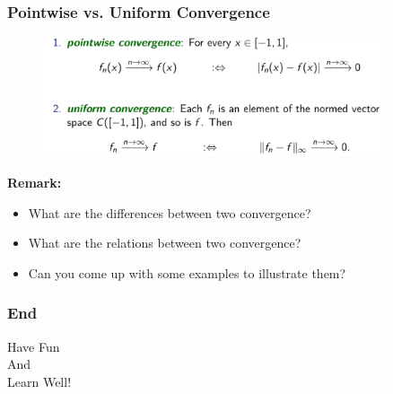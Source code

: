 \documentclass[10pt, t]{beamer}
\begin{document}
\begin{frame}
    \frametitle{Pointwise vs. Uniform Convergence}

    \begin{figure}[H]
        \centering
        \includegraphics[width=0.9\textwidth]{2020-11-17-20-25-28.png}
    \end{figure}
    \textbf{Remark:}
    \begin{itemize}
        \item What are the differences between two convergence?
        \item What are the relations between two convergence?
        \item Can you come up with some examples to illustrate them?
    \end{itemize}

\end{frame}

\begin{frame}
    \frametitle{End}
    \vspace{2.2cm}
    \begin{center}
        \Large
        Have Fun \\
        And \\
        Learn Well!
    \end{center}
\end{frame}
\end{document}
